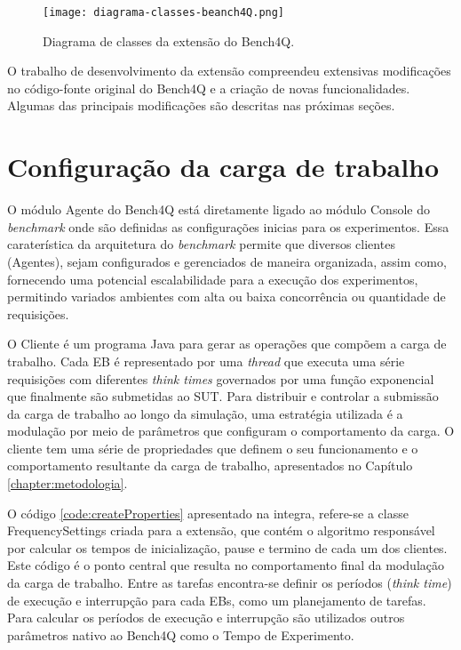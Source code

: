 \begin{figure}[!htb]
	\centering
	\texttt{[image: diagrama-classes-beanch4Q.png]}	
	\caption{Diagrama de classes da extensão do Bench4Q.}
	\label{fig:diagrama-classes}
	\fautor
\end{figure}

O trabalho de desenvolvimento da extensão compreendeu extensivas modificações no código-fonte original do Bench4Q e a criação de novas funcionalidades. Algumas das principais modificações são descritas nas próximas seções.

\section{Configuração da carga de trabalho}
O módulo Agente do Bench4Q está diretamente ligado ao módulo Console do \textit{benchmark} onde são definidas as configurações inicias para os experimentos. Essa caraterística da arquitetura do \textit{benchmark} permite que diversos clientes (Agentes), sejam configurados e gerenciados de maneira organizada, assim como, fornecendo uma potencial escalabilidade para a execução dos experimentos, permitindo variados ambientes com alta ou baixa concorrência ou quantidade de requisições.

O Cliente é um programa Java para gerar as operações que compõem a carga de trabalho. Cada EB é representado por uma \textit{thread} que executa uma série requisições com diferentes \textit{think times} governados por uma função exponencial que finalmente são submetidas ao SUT. Para distribuir e controlar a submissão da carga de trabalho ao longo da simulação, uma estratégia utilizada é a modulação por meio de parâmetros que configuram o comportamento da carga. O cliente tem uma série de propriedades que definem o seu funcionamento e o comportamento resultante da carga de trabalho, apresentados no Capítulo \ref{chapter:metodologia}. 

O código \ref{code:createProperties} apresentado na integra, refere-se a classe \textsf{FrequencySettings} criada para a extensão, que contém o algoritmo responsável por calcular os tempos de inicialização, pause e termino de cada um dos clientes. Este código é o ponto central que resulta no comportamento final da modulação da carga de trabalho. Entre as tarefas encontra-se  definir os períodos (\textit{think time}) de execução e interrupção para cada EBs, como um planejamento de tarefas. Para calcular os períodos de execução e interrupção são utilizados outros parâmetros nativo ao Bench4Q como o Tempo de Experimento.

